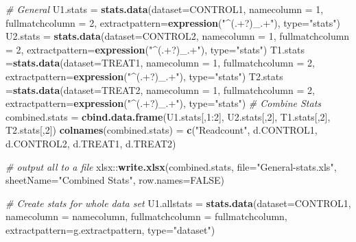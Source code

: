 \documentclass[]{article}
\newenvironment{Shaded}{\begin{snugshade}}{\end{snugshade}}
\newcommand{\KeywordTok}[1]{\textcolor[rgb]{0.13,0.29,0.53}{\textbf{{#1}}}}
\newcommand{\DataTypeTok}[1]{\textcolor[rgb]{0.13,0.29,0.53}{{#1}}}
\newcommand{\DecValTok}[1]{\textcolor[rgb]{0.00,0.00,0.81}{{#1}}}
\newcommand{\StringTok}[1]{\textcolor[rgb]{0.31,0.60,0.02}{{#1}}}
\newcommand{\CommentTok}[1]{\textcolor[rgb]{0.56,0.35,0.01}{\textit{{#1}}}}
\newcommand{\OtherTok}[1]{\textcolor[rgb]{0.56,0.35,0.01}{{#1}}}
\newcommand{\NormalTok}[1]{{#1}}
\begin{document}
\begin{Shaded}
\begin{Highlighting}[]
\CommentTok{# General}
\NormalTok{U1.stats =}\StringTok{ }\KeywordTok{stats.data}\NormalTok{(}\DataTypeTok{dataset=}\NormalTok{CONTROL1, }\DataTypeTok{namecolumn =} \DecValTok{1}\NormalTok{, }\DataTypeTok{fullmatchcolumn =} \DecValTok{2}\NormalTok{,}
                      \DataTypeTok{extractpattern=}\KeywordTok{expression}\NormalTok{(}\StringTok{"^(.+?)_.+"}\NormalTok{), }\DataTypeTok{type=}\StringTok{"stats"}\NormalTok{)}
\NormalTok{U2.stats =}\StringTok{ }\KeywordTok{stats.data}\NormalTok{(}\DataTypeTok{dataset=}\NormalTok{CONTROL2, }\DataTypeTok{namecolumn =} \DecValTok{1}\NormalTok{, }\DataTypeTok{fullmatchcolumn =} \DecValTok{2}\NormalTok{,}
                      \DataTypeTok{extractpattern=}\KeywordTok{expression}\NormalTok{(}\StringTok{"^(.+?)_.+"}\NormalTok{), }\DataTypeTok{type=}\StringTok{"stats"}\NormalTok{)}
\NormalTok{T1.stats =}\KeywordTok{stats.data}\NormalTok{(}\DataTypeTok{dataset=}\NormalTok{TREAT1, }\DataTypeTok{namecolumn =} \DecValTok{1}\NormalTok{, }\DataTypeTok{fullmatchcolumn =} \DecValTok{2}\NormalTok{,}
                     \DataTypeTok{extractpattern=}\KeywordTok{expression}\NormalTok{(}\StringTok{"^(.+?)_.+"}\NormalTok{), }\DataTypeTok{type=}\StringTok{"stats"}\NormalTok{)}
\NormalTok{T2.stats =}\KeywordTok{stats.data}\NormalTok{(}\DataTypeTok{dataset=}\NormalTok{TREAT2, }\DataTypeTok{namecolumn =} \DecValTok{1}\NormalTok{, }\DataTypeTok{fullmatchcolumn =} \DecValTok{2}\NormalTok{,}
                     \DataTypeTok{extractpattern=}\KeywordTok{expression}\NormalTok{(}\StringTok{"^(.+?)_.+"}\NormalTok{), }\DataTypeTok{type=}\StringTok{"stats"}\NormalTok{)}
\CommentTok{# Combine Stats}
\NormalTok{combined.stats =}\StringTok{ }\KeywordTok{cbind.data.frame}\NormalTok{(U1.stats[,}\DecValTok{1}\NormalTok{:}\DecValTok{2}\NormalTok{], U2.stats[,}\DecValTok{2}\NormalTok{], T1.stats[,}\DecValTok{2}\NormalTok{], T2.stats[,}\DecValTok{2}\NormalTok{])}
\KeywordTok{colnames}\NormalTok{(combined.stats) =}\StringTok{ }\KeywordTok{c}\NormalTok{(}\StringTok{"Readcount"}\NormalTok{, d.CONTROL1, d.CONTROL2, d.TREAT1, d.TREAT2)}

\CommentTok{# output all to a file}
\NormalTok{xlsx::}\KeywordTok{write.xlsx}\NormalTok{(combined.stats, }\DataTypeTok{file=}\StringTok{"General-stats.xls"}\NormalTok{, }\DataTypeTok{sheetName=}\StringTok{"Combined Stats"}\NormalTok{, }\DataTypeTok{row.names=}\OtherTok{FALSE}\NormalTok{)}

\CommentTok{# Create stats for whole data set}
\NormalTok{U1.allstats =}\StringTok{ }\KeywordTok{stats.data}\NormalTok{(}\DataTypeTok{dataset=}\NormalTok{CONTROL1, }\DataTypeTok{namecolumn =} \NormalTok{namecolumn,}
    \DataTypeTok{fullmatchcolumn =} \NormalTok{fullmatchcolumn, }\DataTypeTok{extractpattern=}\NormalTok{g.extractpattern, }\DataTypeTok{type=}\StringTok{"dataset"}\NormalTok{)}
\end{Highlighting}
\end{Shaded}
\end{document}
